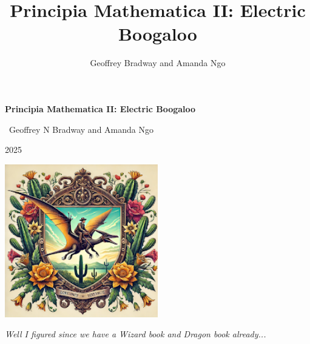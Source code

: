 \title{Principia Mathematica II: Electric Boogaloo}
\author{Geoffrey Bradway and Amanda Ngo}


\begin{titlepage}
    \centering
    {\Huge \bfseries Principia Mathematica II: Electric Boogaloo \cite{newton}}\par
    \vspace{2cm}
    {\ Geoffrey N Bradway and Amanda Ngo}\par
    {\large 2025}\par
    \vfill
    \includegraphics[width=0.5\textwidth]{figures/dino.png} \par
    \vspace{1cm}
    {\itshape Well I figured since we have a Wizard book \cite{sicp} and Dragon book \cite{dragon} already...}\par
\end{titlepage}
